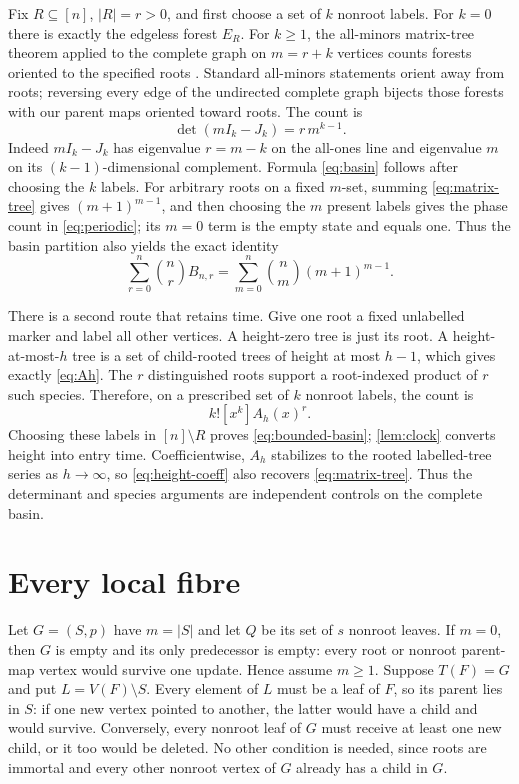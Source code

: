 \documentclass[10pt,a4paper]{amsart}
\theoremstyle{definition}
\begin{document}
Fix $R\subseteq[n]$, $|R|=r>0$, and first choose a set of $k$ nonroot
labels.  For $k=0$ there is exactly the edgeless forest $E_R$.  For $k\geq1$,
the all-minors matrix-tree theorem applied to the complete graph on
$m=r+k$ vertices counts forests oriented to the specified roots
\cite{Chaiken1982}.  Standard all-minors statements orient away from roots;
reversing every edge of the undirected complete graph bijects those forests
with our parent maps oriented toward roots.  The count is
\[
 \det(mI_k-J_k)=r\,m^{k-1}.                                  \tag{3.1}\label{eq:matrix-tree}
\]
Indeed $mI_k-J_k$ has eigenvalue $r=m-k$ on the all-ones line and eigenvalue
$m$ on its $(k-1)$-dimensional complement.  Formula \eqref{eq:basin} follows after
choosing the $k$ labels.  For arbitrary roots on a fixed $m$-set, summing
\eqref{eq:matrix-tree} gives $(m+1)^{m-1}$, and then choosing the $m$ present labels
gives the phase count in \eqref{eq:periodic}; its $m=0$ term is the empty state
and equals one.  Thus the basin partition also yields
the exact identity
\[
 \sum_{r=0}^{n}\binom nr B_{n,r}
 =\sum_{m=0}^{n}\binom nm(m+1)^{m-1}.                         \tag{3.2}
\]

There is a second route that retains time.  Give one root a fixed unlabelled
marker and label all other vertices.  A height-zero tree is just its root.
A height-at-most-$h$ tree is a set of child-rooted trees of height at most
$h-1$, which gives exactly \eqref{eq:Ah}.  The $r$ distinguished roots support
a root-indexed product of $r$ such species.  Therefore, on a prescribed set of
$k$ nonroot labels, the count is
\[
 k![x^k]A_h(x)^r.                                             \tag{3.3}\label{eq:height-coeff}
\]
Choosing these labels in $[n]\setminus R$ proves \eqref{eq:bounded-basin};
\cref{lem:clock} converts height into entry time.  Coefficientwise,
$A_h$ stabilizes to the rooted labelled-tree series as $h\to\infty$, so
\eqref{eq:height-coeff} also recovers \eqref{eq:matrix-tree}.  Thus the determinant and species
arguments are independent controls on the complete basin.

\section{Every local fibre}

Let $G=(S,p)$ have $m=|S|$ and let $Q$ be its set of $s$ nonroot leaves.
If $m=0$, then $G$ is empty and its only predecessor is empty: every root or
nonroot parent-map vertex would survive one update.  Hence assume $m\geq1$.
Suppose $T(F)=G$ and put $L=V(F)\setminus S$.  Every element of $L$ must be a
leaf of $F$, so its parent lies in $S$: if one new vertex pointed to another,
the latter would have a child and would survive.  Conversely, every
nonroot leaf of $G$ must receive at least one new child, or it too would be
deleted.  No other condition is needed, since roots are immortal and every
other nonroot vertex of $G$ already has a child in $G$.
\end{document}
